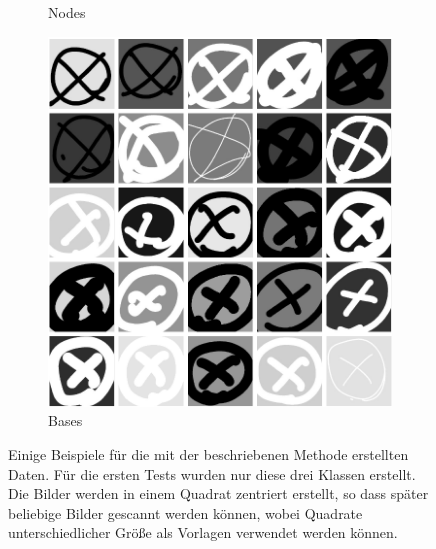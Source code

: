 \begin{figure}
\begin{subfigure}[b]{0.3\textwidth}
        \caption{Nodes}
        \label{fig:25_links}
    \end{subfigure}
    \begin{subfigure}[b]{0.3\textwidth}
        \includegraphics[width=\textwidth]{images/25_x.png}
        \caption{Bases}
        \label{fig:25_bases}
    \end{subfigure}
    \caption[Beispiele für die Trainingsnodes]{ Einige Beispiele für die mit der beschriebenen Methode erstellten Daten. Für die ersten Tests wurden nur diese drei Klassen erstellt. Die Bilder werden in einem Quadrat zentriert erstellt, so dass später beliebige Bilder gescannt werden können, wobei Quadrate unterschiedlicher Größe als Vorlagen verwendet werden können. }
    \label{fig:generated_data_samples}
\end{figure}

